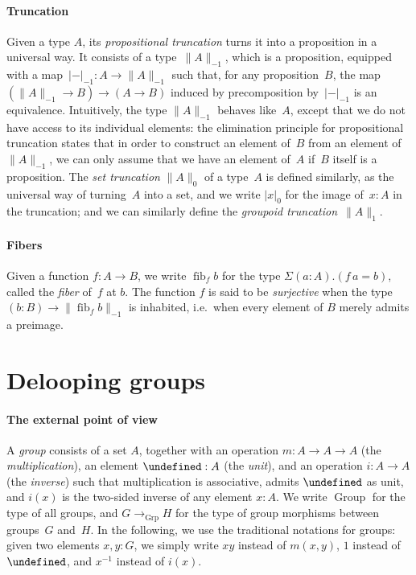 \documentclass[10pt,a4paper]{amsart}
\theoremstyle{definition}
\newcommand{\trunc}[2]{\|#2\|_{#1}} %
\newcommand{\ptrunc}[1]{\trunc{-1}{#1}} %
\newcommand{\strunc}[1]{\trunc0{#1}} %
\newcommand{\gtrunc}[1]{\trunc1{#1}} %
\newcommand{\trunq}[2]{|#2|_{#1}} %
\newcommand{\ptrunq}[1]{\trunq{-1}{#1}} %
\newcommand{\strunq}[1]{\trunq0{#1}} %
\newcommand{\defd}{:=} %
\newcommand{\fib}[1]{\operatorname{fib}_{#1}} %
\newcommand{\toGroup}{\to_{\operatorname{Grp}}} %
\newcommand{\Set}{\operatorname{Set}} %
\newcommand{\Group}{\operatorname{Group}} %
\newcommand{\gm}{m} %
\let\ge\undefined
\newcommand{\ge}{e} %
\newcommand{\gi}{i} %
\newcommand{\ie}{i.e.~}
\begin{document}
\paragraph{Truncation}
Given a type $A$, its \emph{propositional truncation} turns it into a
proposition in a universal way. It consists of a type~$\ptrunc{A}$, which is a
proposition, equipped with a map~$\ptrunq-:A\to\ptrunc{A}$ such that, for any
proposition~$B$, the map $(\ptrunc A\to B)\to(A\to B)$ induced by precomposition
by~$\ptrunq-$ is an equivalence. Intuitively, the type $\ptrunc A$ behaves like~$A$,
except that we do not have access to its individual elements: the elimination
principle for propositional truncation states that in order to construct an
element of~$B$ from an element of~$\ptrunc A$, we can only assume that we have
an element of~$A$ if~$B$ itself is a proposition.
%
The \emph{set truncation} $\strunc A$ of a type~$A$ is defined similarly, as the
universal way of turning~$A$ into a set, and we write $\strunq{x}$ for the image
of~$x:A$ in the truncation; and we can similarly define the \emph{groupoid truncation}~$\gtrunc A$.

\paragraph{Fibers}
Given a function $f:A\to B$, we write $\fib fb$ for the type $\Sigma(a:A).(f\,a=b)$, called the \emph{fiber} of~$f$ at $b$. The function $f$ is said to be \emph{surjective} when the type $(b:B)\to\ptrunc{\fib fb}$ is inhabited, \ie when every element of $B$ merely admits a preimage.



\section{Delooping groups}
\label{delooping}

\paragraph{The external point of view}
A \emph{group} consists of a set $A$, together with an operation
$\gm:A\to A\to A$ (the \emph{multiplication}), an element $\ge:A$ (the
\emph{unit}), and an operation $\gi:A\to A$ (the \emph{inverse}) such that
multiplication is associative, admits $\ge$ as unit, and $\gi(x)$ is the
two-sided inverse of any element $x:A$. We write $\Group$ for the type of all
groups, and $G\toGroup H$ for the type of group morphisms between groups~$G$
and~$H$.
%
In the following, we use the traditional notations for groups: given two
elements $x,y:G$, we simply write $xy$ instead of $\gm(x,y)$, $1$ instead of
$\ge$, and $x^{-1}$ instead of $\gi(x)$.
\end{document}
